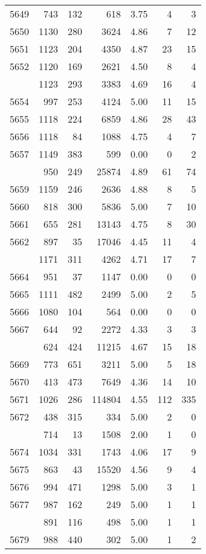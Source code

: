 \documentclass[
]{article}
\begin{document}
\begin{table}
\begin{tabular}[t]{lrrrrrr}
5649 & 743 & 132 & 618 & 3.75 & 4 & 3\\
5650 & 1130 & 280 & 3624 & 4.86 & 7 & 12\\
5651 & 1123 & 204 & 4350 & 4.87 & 23 & 15\\
5652 & 1120 & 169 & 2621 & 4.50 & 8 & 4\\
\addlinespace
5653 & 1123 & 293 & 3383 & 4.69 & 16 & 4\\
5654 & 997 & 253 & 4124 & 5.00 & 11 & 15\\
5655 & 1118 & 224 & 6859 & 4.86 & 28 & 43\\
5656 & 1118 & 84 & 1088 & 4.75 & 4 & 7\\
5657 & 1149 & 383 & 599 & 0.00 & 0 & 2\\
\addlinespace
5658 & 950 & 249 & 25874 & 4.89 & 61 & 74\\
5659 & 1159 & 246 & 2636 & 4.88 & 8 & 5\\
5660 & 818 & 300 & 5836 & 5.00 & 7 & 10\\
5661 & 655 & 281 & 13143 & 4.75 & 8 & 30\\
5662 & 897 & 35 & 17046 & 4.45 & 11 & 4\\
\addlinespace
5663 & 1171 & 311 & 4262 & 4.71 & 17 & 7\\
5664 & 951 & 37 & 1147 & 0.00 & 0 & 0\\
5665 & 1111 & 482 & 2499 & 5.00 & 2 & 5\\
5666 & 1080 & 104 & 564 & 0.00 & 0 & 0\\
5667 & 644 & 92 & 2272 & 4.33 & 3 & 3\\
\addlinespace
5668 & 624 & 424 & 11215 & 4.67 & 15 & 18\\
5669 & 773 & 651 & 3211 & 5.00 & 5 & 18\\
5670 & 413 & 473 & 7649 & 4.36 & 14 & 10\\
5671 & 1026 & 286 & 114804 & 4.55 & 112 & 335\\
5672 & 438 & 315 & 334 & 5.00 & 2 & 0\\
\addlinespace
5673 & 714 & 13 & 1508 & 2.00 & 1 & 0\\
5674 & 1034 & 331 & 1743 & 4.06 & 17 & 9\\
5675 & 863 & 43 & 15520 & 4.56 & 9 & 4\\
5676 & 994 & 471 & 1298 & 5.00 & 3 & 1\\
5677 & 987 & 162 & 249 & 5.00 & 1 & 1\\
\addlinespace
5678 & 891 & 116 & 498 & 5.00 & 1 & 1\\
5679 & 988 & 440 & 302 & 5.00 & 1 & 2\\

\end{tabular}
\end{table}
\end{document}
